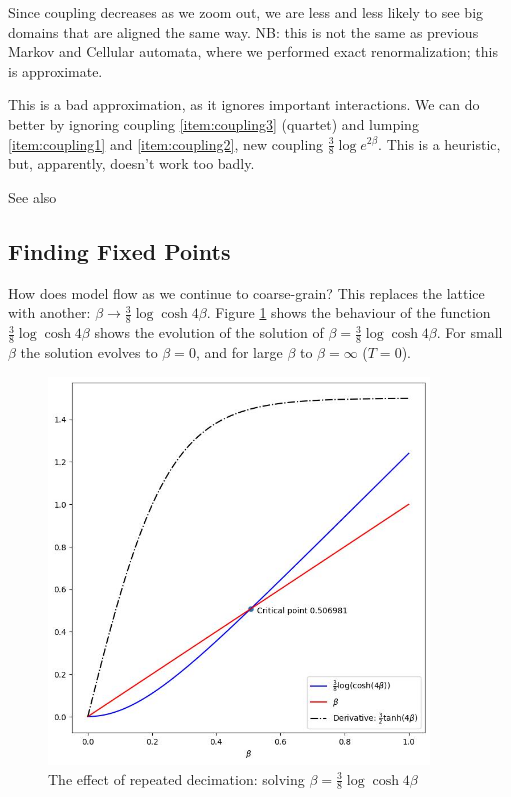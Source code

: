 \documentclass[]{article}
\begin{document}
Since coupling decreases as we zoom out, we are less and less likely to see big domains that are aligned the same way. NB: this is not the same as previous Markov and Cellular automata, where we performed exact renormalization; this is approximate.

This is a bad approximation, as it ignores important interactions. We can do better by ignoring coupling \ref{item:coupling3} (quartet) and lumping \ref{item:coupling1} and \ref{item:coupling2}, new coupling $\frac{3}{8} \log{e^{2\beta} }$. This is a heuristic, but, apparently, doesn't work too badly.


See also \cite[Chapter 14]{kadanoff2000statistical}


\subsection{Finding Fixed Points}

How does model flow as we continue to coarse-grain? This replaces the lattice with another:  $\beta\rightarrow\frac{3}{8} \log{\cosh{4\beta} }$. Figure \ref{fig:beta} shows the behaviour of the function $\frac{3}{8} \log{\cosh{4\beta} }$ shows the evolution of the solution of  $\beta=\frac{3}{8} \log{\cosh{4\beta} }$. For small $\beta$ the solution evolves to $\beta=0$, and for large $\beta$ to $\beta=\infty$ ($T=0$).


\begin{figure}[H]
	\caption{The effect of repeated decimation: solving $\beta=\frac{3}{8} \log{\cosh{4\beta} }$}\label{fig:beta}
	\includegraphics[width=0.9\textwidth]{beta}
\end{figure}
\end{document}
